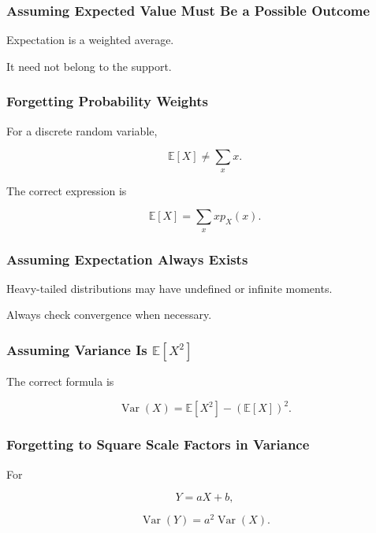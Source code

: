 \subsubsection{Assuming Expected Value Must Be a Possible Outcome}

Expectation is a weighted average.

It need not belong to the support.

\subsubsection{Forgetting Probability Weights}

For a discrete random variable,

\[
\mathbb{E}[X]
\neq
\sum_x x.
\]

The correct expression is

\[
\boxed{
\mathbb{E}[X]
=
\sum_xxp_X(x).
}
\]

\subsubsection{Assuming Expectation Always Exists}

Heavy-tailed distributions may have undefined or infinite moments.

Always check convergence when necessary.

\subsubsection{Assuming Variance Is \(\mathbb{E}[X^2]\)}

The correct formula is

\[
\boxed{
\operatorname{Var}(X)
=
\mathbb{E}[X^2]
-
(\mathbb{E}[X])^2.
}
\]

\subsubsection{Forgetting to Square Scale Factors in Variance}

For

\[
Y=aX+b,
\]

\[
\boxed{
\operatorname{Var}(Y)
=
a^2\operatorname{Var}(X).
}
\]

